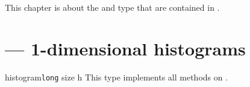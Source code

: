 \newcommand{\refhistogramindex}[2]{\parbox{5cm}{\texttt{#2}}\index{#2@\texttt{#2} (in #1)}}

This chapter is about the  and  type that
are contained in .

\section{\protect{} --- 1-dimensional histograms}

\begin{classdesc}{histogram}{\texttt{long} size \code{|}  h}
This type implements all methods on .
\end{classdesc}

